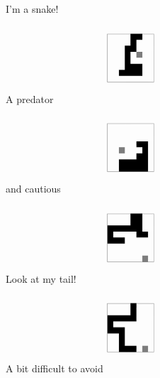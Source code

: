 \documentclass[a4paper]{article}
\begin{document}
\begin{figure}
\begin{subfigure}[b]{0.24\textwidth}
        \caption{I'm a snake!}
    \end{subfigure}
    \begin{subfigure}[b]{0.24\textwidth}
        \includegraphics[width=\textwidth]{qsnake_snaps/11}
        \caption{A predator}
    \end{subfigure}
    \begin{subfigure}[b]{0.24\textwidth}
        \includegraphics[width=\textwidth]{qsnake_snaps/12}
        \caption{and cautious}
    \end{subfigure}
    \begin{subfigure}[b]{0.24\textwidth}
        \includegraphics[width=\textwidth]{qsnake_snaps/13}
        \caption{Look at my tail!}
    \end{subfigure}
    \begin{subfigure}[b]{0.24\textwidth}
        \includegraphics[width=\textwidth]{qsnake_snaps/14}
        \caption{A bit difficult to avoid}
    \end{subfigure}
    \begin{subfigure}[b]{0.24\textwidth}

\end{subfigure}
\end{figure}
\end{document}
